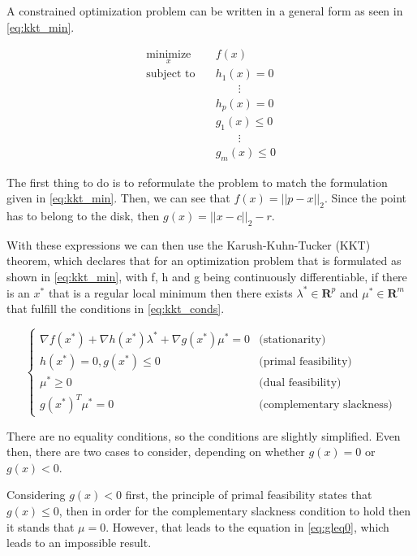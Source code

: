 A constrained optimization problem can be written in a general form as seen in \eqref{eq:kkt_min}.

\begin{equation}
\begin{aligned}
\label{eq:kkt_min}
\underset{x}{\text{minimize}} \quad & f(x) \\
\text{subject to} \quad & h_1(x) = 0 \\
                  & \qquad \vdots \\
                  & h_p(x) = 0 \\
                  & g_1(x) \leq 0 \\
                  & \qquad \vdots \\
                  & g_m(x) \leq 0
\end{aligned}
\end{equation}

The first thing to do is to reformulate the problem to match the formulation given in \eqref{eq:kkt_min}. Then, we can see that $f(x) = ||p-x||_2$. Since the point has to belong to the disk, then $g(x) = ||x - c||_2 - r$. 

With these expressions we can then use the Karush-Kuhn-Tucker (KKT) theorem, which declares that for an optimization problem that is formulated as shown in \eqref{eq:kkt_min}, with f, h and g being continuously differentiable, if there is an $x^*$ that is a regular local minimum then there exists $\lambda^* \in \mathbf{R}^p$ and $\mu^* \in \mathbf{R}^m$ that fulfill the conditions in \eqref{eq:kkt_conds}.

\begin{equation}
\begin{cases}
\label{eq:kkt_conds}
	\nabla f(x^*) + \nabla h(x^*) \lambda^* + \nabla g(x^*) \mu^* = 0 & \text{(stationarity)} \\
	h(x^*) = 0, g(x^*) \leq 0 & \text{(primal feasibility)} \\
	\mu^* \geq 0 & \text{(dual feasibility)} \\
	g(x^*)^T \mu^* = 0 & \text{(complementary slackness)}
\end{cases}
\end{equation}

There are no equality conditions, so the conditions are slightly simplified. Even then, there are two cases to consider, depending on whether $g(x) = 0$ or $g(x) < 0$.

Considering $g(x) < 0$ first, the principle of primal feasibility states that $g(x) \leq 0$, then in order for the complementary slackness condition to hold then it stands that $\mu = 0$. However, that leads to the equation in \eqref{eq:gleq0}, which leads to an impossible result.

